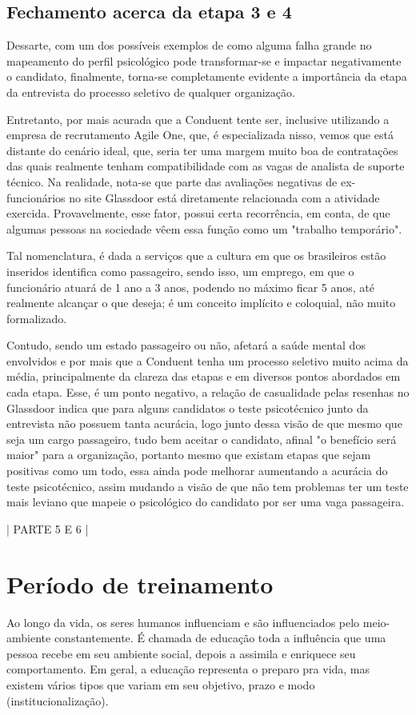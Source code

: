 \documentclass[12pt]{article}
\begin{document}
\section{Fechamento acerca da etapa 3 e 4}


Dessarte, com um dos possíveis exemplos de como alguma falha grande no mapeamento do perfil psicológico pode transformar-se e impactar negativamente o candidato, finalmente, torna-se completamente evidente a importância da etapa da entrevista do processo seletivo de qualquer organização.

Entretanto, por mais acurada que a Conduent tente ser, inclusive utilizando a empresa de recrutamento Agile One, que, é especializada nisso, vemos que está distante do cenário ideal, que, seria ter uma margem muito boa de contratações das quais realmente tenham compatibilidade com as vagas de analista de suporte técnico. Na realidade, nota-se que parte das avaliações negativas de ex-funcionários no site Glassdoor está diretamente relacionada com a atividade exercida. Provavelmente, esse fator, possui certa recorrência, em conta, de que algumas pessoas na sociedade vêem essa função como um "trabalho temporário".

Tal nomenclatura, é dada a serviços que a cultura em que os brasileiros estão inseridos identifica como passageiro, sendo isso, um emprego, em que o funcionário atuará de 1 ano a 3 anos, podendo no máximo ficar 5 anos, até realmente alcançar o que deseja; é um conceito implícito e coloquial, não muito formalizado. 

Contudo, sendo um estado passageiro ou não, afetará a saúde mental dos envolvidos e por mais que a Conduent tenha um processo seletivo muito acima da média, principalmente da clareza das etapas e em diversos pontos abordados em cada etapa. Esse, é um ponto negativo, a relação de casualidade pelas resenhas no Glassdoor indica que para alguns candidatos o teste psicotécnico junto da entrevista não possuem tanta acurácia, logo junto dessa visão de que mesmo que seja um cargo passageiro, tudo bem aceitar o candidato, afinal "o benefício será maior" para a organização, portanto mesmo que existam etapas que sejam positivas como um todo, essa ainda pode melhorar aumentando a acurácia do teste psicotécnico, assim mudando a visão de que não tem problemas ter um teste mais leviano que mapeie o psicológico do candidato por ser uma vaga passageira.


| PARTE 5 E 6 |

\chapter{Período de treinamento}
Ao longo da vida, os seres humanos influenciam e são influenciados pelo meio-ambiente constantemente. É chamada de educação toda a influência que uma pessoa recebe em seu ambiente social, depois a assimila e enriquece seu comportamento. Em geral, a educação representa o preparo pra vida, mas existem vários tipos que variam em seu objetivo, prazo e modo (institucionalização). 
\end{document}
